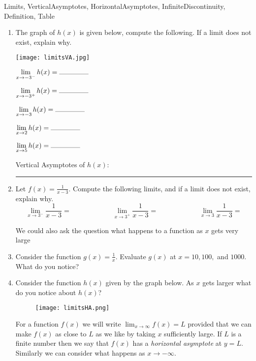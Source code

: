 \begin{tagblock}{Limits, VerticalAsymptotes, HorizontalAsymptotes, InfiniteDiscontinuity, Definition, Table}
\begin{question}
\begin{enumerate}
\bigskip
\item The graph of $h(x)$ is given below, compute the following.  If a limit does not exist, explain why.  
\begin{minipage}{.6\textwidth}
\texttt{[image: limitsVA.jpg]}\end{minipage}%
\begin{minipage}{.4\textwidth}

\bigskip
 $\displaystyle \lim_{x \to -3^-} h(x) =  \rule{1.5cm}{.1mm}$  
 \bigskip
 
 $\displaystyle \lim_{x \to -3^+} h(x) =  \rule{1.5cm}{.1mm}$ 
 \bigskip
 
  $\displaystyle \lim_{x \to -3} h(x) =  \rule{1.5cm}{.1mm}$ 
\bigskip
 
 $\displaystyle \lim_{x \to 2} h(x) =  \rule{1.5cm}{.1mm}$ 
 \bigskip
 
 $\displaystyle \lim_{x \to 5} h(x) =  \rule{1.5cm}{.1mm}$ 
 \bigskip
  \end{minipage}
\bigskip
  
 Vertical Asymptotes of $h(x)$:   \rule{6cm}{.1mm}

\newpage

\item Let $\displaystyle f(x) = \frac{1}{x-3}$.  Compute the following limits, and if a limit does not exist, explain why. 
\[ \lim_{x \to 3^-}  \frac{1}{x-3} = \hspace{1in}  \lim_{x \to 3^+}  \frac{1}{x-3} = \hspace{1in}  \lim_{x \to 3}  \frac{1}{x-3} = \]


\vspace{1in}


We could also ask the question what happens to a function as $x$ gets very large
\item Consider the function $\displaystyle g(x) = \frac{1}{x}$.   Evaluate $g(x)$ at $x=10, 100,$ and $1000$.  What do you notice?

\vspace{1in}
\item Consider the function $h(x)$ given by the graph below.  As $x$ gets larger what do you notice about $h(x)$?
\begin{figure}[h]
\centering
\texttt{[image: limitsHA.png]}
\end{figure}

For a function $f(x)$ we will write $\lim_{x \to \infty} f(x) = L$  provided that we can make $f(x)$ as close to $L$ as we like by taking $x$ sufficiently large.  If $L$ is a finite number then we say that $f(x)$ has a \emph{horizontal asymptote} at $y=L$.  Similarly we can consider what happens as $x \to -\infty$.  


\end{enumerate}
\end{question}
\end{tagblock}
